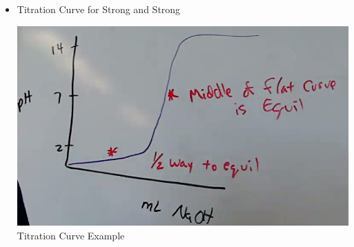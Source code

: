 \documentclass[12pt]{article}
\begin{document}
\begin{itemize}
  \item Titration Curve for Strong and Strong

    \begin{center}
      \includegraphics[width=.8\textwidth]{Figures/TitrationCurveSS.png}\\
      Titration Curve Example
    \end{center}

\end{itemize}
\end{document}
